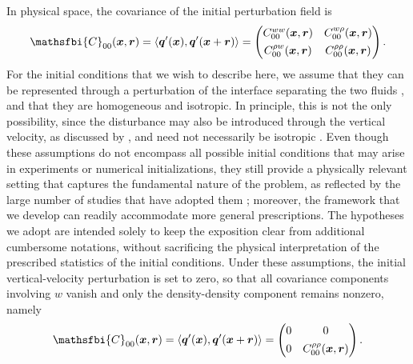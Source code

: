 In physical space, the covariance of the initial perturbation field is
\begin{equation}
    \mathsfbi{C}_{00}(\boldsymbol{x},\boldsymbol{r})
    =
    \mean{
        \boldsymbol{q}'(\boldsymbol{x}),
        \boldsymbol{q}'(\boldsymbol{x}+\boldsymbol{r})
    }
    =
    \begin{pmatrix}
        C_{00}^{ww}(\boldsymbol{x},\boldsymbol{r})
        &
        C_{00}^{w\rho}(\boldsymbol{x},\boldsymbol{r})
        \\[4pt]
        C_{00}^{\rho w}(\boldsymbol{x},\boldsymbol{r})
        &
        C_{00}^{\rho\rho}(\boldsymbol{x},\boldsymbol{r})
    \end{pmatrix}.
    \label{eq:physical_covariance_general}
\end{equation}
For the initial conditions that we wish to describe here, we assume that they can be represented through a perturbation of the interface separating the two fluids \citep{cook-dimotakis-2001,wei-livescu-2012}, and that they are homogeneous and isotropic. In principle, this is not the only possibility, since the disturbance may also be introduced through the vertical velocity, as discussed by \citet{mueschke-schilling-2009}, and need not necessarily be isotropic \citep{dalziel-linden-youngs-1999}. Even though these assumptions do not encompass all possible initial conditions that may arise in experiments or numerical initializations, they still provide a physically relevant setting that captures the fundamental nature of the problem, as reflected by the large number of studies that have adopted them \citep{kord-capecelatro-2019}; moreover, the framework that we develop can readily accommodate more general prescriptions. The hypotheses we adopt are intended solely to keep the exposition clear from additional cumbersome notations, without sacrificing the physical interpretation of the prescribed statistics of the initial conditions. Under these assumptions, the initial vertical-velocity perturbation is set to zero, so that all covariance components involving \(w\) vanish and only the density-density component remains nonzero, namely
\begin{equation}
    \mathsfbi{C}_{00}(\boldsymbol{x},\boldsymbol{r})
    =
    \mean{
        \boldsymbol{q}'(\boldsymbol{x}),
        \boldsymbol{q}'(\boldsymbol{x}+\boldsymbol{r})
    }
    =
    \begin{pmatrix}
        0 & 0
        \\[4pt]
        0 & C_{00}^{\rho\rho}(\boldsymbol{x},\boldsymbol{r})
    \end{pmatrix}.
    \label{eq:physical_covariance_density_only}
\end{equation}
